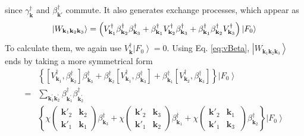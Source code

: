 \documentclass[aps,prb,superscriptaddress,showpacs,reprint,lengthcheck]{revtex4-1}
\newcommand{\vk}{\ensuremath{\mathbf{k}}}
\begin{document}
since $\gamma^{\dagger}_{\mathbf{k}}$ and $\beta^{\dagger}_{\mathbf{k}'}$ commute.  It also generates exchange processes, which appear as 
\begin{equation}
\left|W_{\mathbf{k} _1\mathbf{k} _2\mathbf{k} _3}\right> =\left(V^{\dagger}_{\mathbf{k} _1}\beta^{\dagger}_{\mathbf{k}
_2}\beta^{\dagger}_{\mathbf{k} _3}+\beta^{\dagger}_{\mathbf{k}
_1}V^{\dagger}_{\mathbf{k} _2}\beta^{\dagger}_{\mathbf{k} _3}+\beta^{%
\dagger}_{\mathbf{k} _1}\beta^{\dagger}_{\mathbf{k} _2}V^{\dagger}_{\mathbf{k%
} _3}\right) \left|F_0\right>  
\end{equation}
To calculate them, we again use $V^{\dagger}_\vk\left|F_0\right>  =0$. Using
Eq. \eqref{eq:vBeta}, $\left|W_{\mathbf{k} _1\mathbf{k} _2\mathbf{k} _3}\right>$ ends by taking  a more symmetrical form 
\begin{equation}  \label{eq:vThree2}
\begin{split}
&\left\{\left[V^{\dagger}_{\mathbf{k} _1},\beta^{\dagger}_{\mathbf{k} _2}%
\right]  \beta^{\dagger}_{\mathbf{k} _3}+\beta^{\dagger}_{\mathbf{k} _2}%
\left[V^{\dagger}_{\mathbf{k} _1},\beta^{\dagger}_{\mathbf{k} _3}\right] 
+\beta^{\dagger}_{\mathbf{k} _1}\left[V^{\dagger}_{\mathbf{k}
_2},\beta^{\dagger}_{\mathbf{k} _3}\right]  \right\} \left|F_0\right>   \\
=&\sum_{\vk^{\prime}_1\mathbf{k} ^{\prime}_2}\beta^{\dagger}_{\mathbf{k}
^{\prime}_1}\beta^{\dagger}_{\mathbf{k} ^{\prime}_2} \\
&\left\{\chi\left(\begin{smallmatrix}\vk'_2&\vk_2\\\vk'_1&\vk_1%
\end{smallmatrix}\right)  \beta^{\dagger}_{\mathbf{k} _3}+\chi\left(%
\begin{smallmatrix}\vk'_2&\vk_3\\\vk'_1&\vk_2\end{smallmatrix}\right) 
\beta^{\dagger}_{\mathbf{k} _1}+\chi\left(\begin{smallmatrix}\vk'_2&\vk_1\
\\\vk'_1&\vk_3\end{smallmatrix}\right)  \beta^{\dagger}_{\mathbf{k}
_2}\right\} \left|F_0\right>  
\end{split}%
\end{equation}
\end{document}
